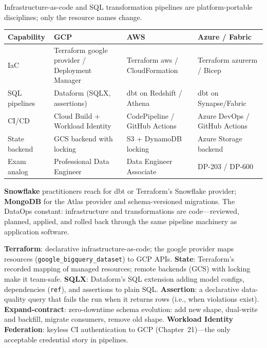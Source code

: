 \begin{crosscloud}
Infrastructure-as-code and SQL transformation pipelines are platform-portable disciplines; only the resource names change.

\vspace{2mm}
{\footnotesize
\begin{tabular}{@{}p{2.8cm}p{3.0cm}p{3.0cm}p{3.0cm}@{}} \\
\toprule
\textbf{Capability} & \textbf{GCP} & \textbf{AWS} & \textbf{Azure / Fabric} \\
\midrule
IaC & Terraform google provider / Deployment Manager & Terraform aws / CloudFormation & Terraform azurerm / Bicep \\
SQL pipelines & Dataform (SQLX, assertions) & dbt on Redshift / Athena & dbt on Synapse/Fabric \\
CI/CD & Cloud Build + Workload Identity & CodePipeline / GitHub Actions & Azure DevOps / GitHub Actions \\
State backend & GCS backend with locking & S3 + DynamoDB locking & Azure Storage backend \\
Exam analog & Professional Data Engineer & Data Engineer Associate & DP-203 / DP-600 \\
\bottomrule
\end{tabular}}

\vspace{1mm}
\textbf{Snowflake} practitioners reach for dbt or Terraform's Snowflake provider; \textbf{MongoDB} for the Atlas provider and schema-versioned migrations. The DataOps constant: infrastructure and transformations are code---reviewed, planned, applied, and rolled back through the same pipeline machinery as application software.
\end{crosscloud}

\begin{keyterms}
\textbf{Terraform}: declarative infrastructure-as-code; the google provider maps resources (\texttt{google\_bigquery\_dataset}) to GCP APIs.
\textbf{State}: Terraform's recorded mapping of managed resources; remote backends (GCS) with locking make it team-safe.
\textbf{SQLX}: Dataform's SQL extension adding model configs, dependencies (\texttt{ref}), and assertions to plain SQL.
\textbf{Assertion}: a declarative data-quality query that fails the run when it returns rows (i.e., when violations exist).
\textbf{Expand-contract}: zero-downtime schema evolution: add new shape, dual-write and backfill, migrate consumers, remove old shape.
\textbf{Workload Identity Federation}: keyless CI authentication to GCP (Chapter~21)---the only acceptable credential story in pipelines.
\end{keyterms}

